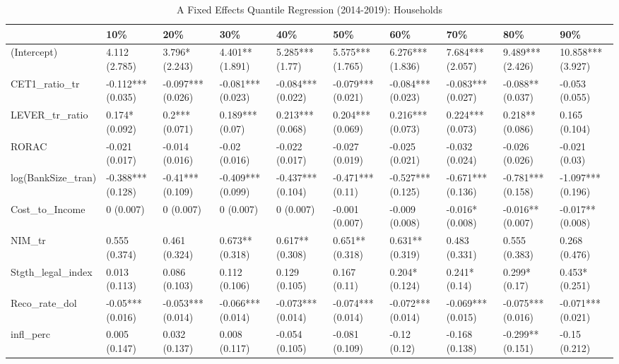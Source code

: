 \begin{table}[ht]
\centering
\caption{A Fixed Effects Quantile Regression (2014-2019): Households} 
\begingroup\small
\begin{tabular}{llllllllll}
  \toprule
 & 10\% & 20\% & 30\% & 40\% & 50\% & 60\% & 70\% & 80\% & 90\% \\ 
  \midrule
(Intercept) & 4.112 (2.785) & 3.796* (2.243) & 4.401** (1.891) & 5.285*** (1.77) & 5.575*** (1.765) & 6.276*** (1.836) & 7.684*** (2.057) & 9.489*** (2.426) & 10.858*** (3.927) \\ 
  CET1\_ratio\_tr & -0.112*** (0.035) & -0.097*** (0.026) & -0.081*** (0.023) & -0.084*** (0.022) & -0.079*** (0.021) & -0.084*** (0.023) & -0.083*** (0.027) & -0.088** (0.037) & -0.053 (0.055) \\ 
  LEVER\_tr\_ratio & 0.174* (0.092) & 0.2*** (0.071) & 0.189*** (0.07) & 0.213*** (0.068) & 0.204*** (0.069) & 0.216*** (0.073) & 0.224*** (0.073) & 0.218** (0.086) & 0.165 (0.104) \\ 
  RORAC & -0.021 (0.017) & -0.014 (0.016) & -0.02 (0.016) & -0.022 (0.017) & -0.027 (0.019) & -0.025 (0.021) & -0.032 (0.024) & -0.026 (0.026) & -0.021 (0.03) \\ 
  log(BankSize\_tran) & -0.388*** (0.128) & -0.41*** (0.109) & -0.409*** (0.099) & -0.437*** (0.104) & -0.471*** (0.11) & -0.527*** (0.125) & -0.671*** (0.136) & -0.781*** (0.158) & -1.097*** (0.196) \\ 
  Cost\_to\_Income & 0 (0.007) & 0 (0.007) & 0 (0.007) & 0 (0.007) & -0.001 (0.007) & -0.009 (0.008) & -0.016* (0.008) & -0.016** (0.007) & -0.017** (0.008) \\ 
  NIM\_tr & 0.555 (0.374) & 0.461 (0.324) & 0.673** (0.318) & 0.617** (0.308) & 0.651** (0.318) & 0.631** (0.319) & 0.483 (0.331) & 0.555 (0.383) & 0.268 (0.476) \\ 
  Stgth\_legal\_index & 0.013 (0.113) & 0.086 (0.103) & 0.112 (0.106) & 0.129 (0.105) & 0.167 (0.11) & 0.204* (0.124) & 0.241* (0.14) & 0.299* (0.17) & 0.453* (0.251) \\ 
  Reco\_rate\_dol & -0.05*** (0.016) & -0.053*** (0.014) & -0.066*** (0.014) & -0.073*** (0.014) & -0.074*** (0.014) & -0.072*** (0.014) & -0.069*** (0.015) & -0.075*** (0.016) & -0.071*** (0.021) \\ 
  infl\_perc & 0.005 (0.147) & 0.032 (0.137) & 0.008 (0.117) & -0.054 (0.105) & -0.081 (0.109) & -0.12 (0.12) & -0.168 (0.138) & -0.299** (0.151) & -0.15 (0.212) \\ 

\end{tabular}
\end{table}
